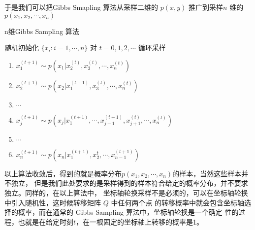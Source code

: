 于是我们可以把Gibbs Smapling 算法从采样二维的 $p(x,y)$ 推广到采样$n$ 维的 $p(x_1,x_2,\cdots, x_n)$
\begin{algorithm}[htb]
\caption{n维Gibbs Sampling 算法}
\begin{algorithmic}[1]
\STATE 随机初始化 $\{x_i : i =1, \cdots, n\}$
\STATE 对 $t=0,1,2,\cdots$ 循环采样
\begin{enumerate}
\item  $x_1^{(t+1)} \sim p(x_1|x_2^{(t)}, x_3^{(t)}, \cdots, x_n^{(t)})$
\item  $x_2^{(t+1)} \sim p(x_2|x_1^{(t+1)}, x_3^{(t)}, \cdots, x_n^{(t)})$
\item  $\cdots$
\item  $x_j^{(t+1)} \sim p(x_j|x_1^{(t+1)}, \cdots, x_{j-1}^{(t+1)}, x_{j+1}^{(t)}, \cdots, x_n^{(t)})$
\item  $\cdots$
\item  $x_n^{(t+1)} \sim p(x_n|x_1^{(t+1)}, x_2^t, \cdots, x_{n-1}^{(t+1)})$
\end{enumerate}
\end{algorithmic}
\end{algorithm}

以上算法收敛后，得到的就是概率分布$p(x_1,x_2,\cdots, x_n)$的样本，当然这些样本并不独立，
但是我们此处要求的是采样得到的样本符合给定的概率分布，并不要求独立。同样的，在以上算法中，
坐标轴轮换采样不是必须的，可以在坐标轴轮换中引入随机性，这时候转移矩阵 $Q$ 中任何两个点
的转移概率中就会包含坐标轴选择的概率，而在通常的 Gibbs Sampling 算法中，坐标轴轮换是一个确定
性的过程，也就是在给定时刻$t$，在一根固定的坐标轴上转移的概率是1。


